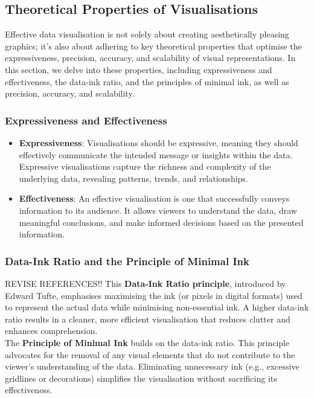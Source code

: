 \documentclass{article}\usepackage[]{graphicx}\usepackage[]{xcolor}
\begin{document}
\subsection{Theoretical Properties of Visualisations}
Effective data visualisation is not solely about creating aesthetically pleasing graphics; it's also about adhering to key theoretical properties that optimise the expressiveness, precision, accuracy, and scalability of visual representations. In this section, we delve into these properties, including expressiveness and effectiveness, the data-ink ratio, and the principles of minimal ink, as well as precision, accuracy, and scalability.

\subsubsection{Expressiveness and Effectiveness}
\begin{itemize}
    \item \textbf{Expressiveness}: Visualisations should be expressive, meaning they should effectively communicate the intended message or insights within the data. Expressive visualisations capture the richness and complexity of the underlying data, revealing patterns, trends, and relationships.
    \item \textbf{Effectiveness}: An effective visualisation is one that successfully conveys information to its audience. It allows viewers to understand the data, draw meaningful conclusions, and make informed decisions based on the presented information.
\end{itemize}

\subsubsection{Data-Ink Ratio and the Principle of Minimal Ink} REVISE REFERENCES!!
This \textbf{Data-Ink Ratio principle}, introduced by Edward Tufte, emphasises maximising the ink (or pixels in digital formats) used to represent the actual data while minimising non-essential ink. A higher data-ink ratio results in a cleaner, more efficient visualisation that reduces clutter and enhances comprehension.\\
The \textbf{Principle of Minimal Ink} builds on the data-ink ratio. This principle advocates for the removal of any visual elements that do not contribute to the viewer's understanding of the data. Eliminating unnecessary ink (e.g., excessive gridlines or decorations) simplifies the visualisation without sacrificing its effectiveness.
\end{document}
